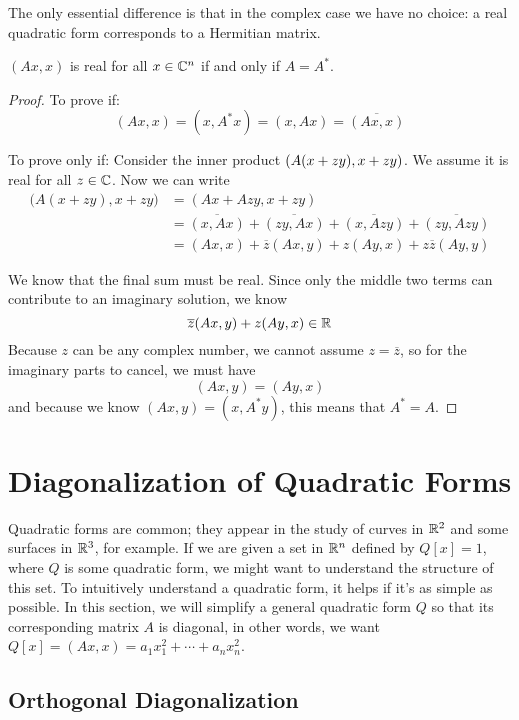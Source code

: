 The only essential difference is that in the complex case we have no choice: a real quadratic form corresponds to a Hermitian matrix. 

\begin{theorem}
$(Ax, x)$ is real for all $x \in \mathbb{C}^{n}$ if and only if $A = A^{*}$.  
\end{theorem}

\begin{proof}
To prove if: 
$$(Ax, x) = (x, A^{*} x) = (x, Ax) = \overline{(Ax, x)}$$

To prove only if: Consider the inner product $(A (x + zy), x + zy \Large)$. We assume it is real for all $z \in \mathbb{C}$. Now we can write 
$$
\begin{aligned}
\Big( A (x + zy), x + zy \Big) &= ( Ax + Azy, x + zy) \\
&= \overline{(x, Ax)} + \overline{(zy, Ax)} + \overline{(x, Azy)} + \overline{(zy, Azy)} \\ 
&= (Ax, x) + \overline{z} (Ax, y) + z (Ay, x) + z \overline{z} (Ay, y)
\end{aligned}
$$

We know that the final sum must be real. Since only the middle two terms can contribute to an imaginary solution, we know 
$$\overline{z} (Ax, y) + z (Ay, x) \in \mathbb{R}$$
Because $z$ can be any complex number, we cannot assume $z = \overline{z}$, so for the imaginary parts to cancel, we must have
$$(Ax, y) = (Ay, x)$$
and because we know $(Ax, y) = (x, A^{*} y)$, this means that $A^{*} = A$. 
\end{proof}

\section{Diagonalization of Quadratic Forms}

Quadratic forms are common; they appear in the study of curves in $\mathbb{R}^{2}$ and some surfaces in $\mathbb{R}^{3}$, for example. If we are given a set in $\mathbb{R}^{n}$ defined by $Q[x] = 1$, where $Q$ is some quadratic form, we might want to understand the structure of this set. To intuitively understand a quadratic form, it helps if it's as simple as possible. In this section, we will simplify a general quadratic form $Q$ so that its corresponding matrix $A$ is diagonal, in other words, we want $Q[x] = (Ax, x) = a_{1} x_{1}^{2} + \cdots + a_{n} x_{n}^{2}$. 

\subsection{Orthogonal Diagonalization}

